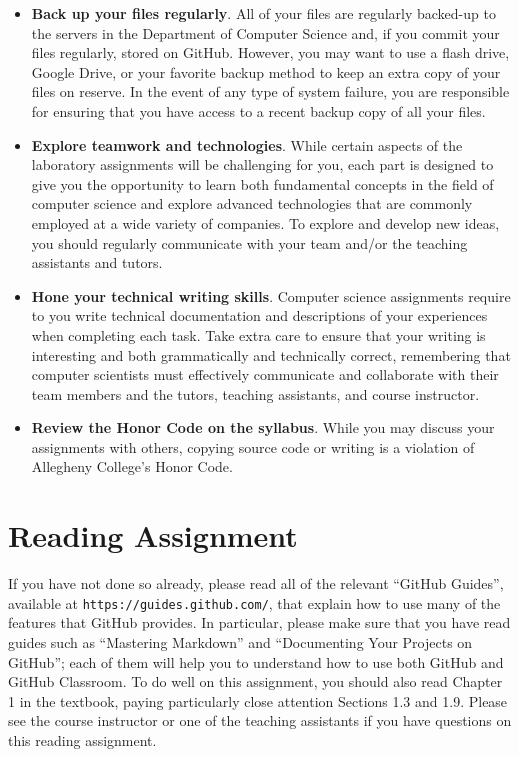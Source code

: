 \documentclass[11pt]{article}
\newcommand{\url}[1]{\lstinline{#1}}
\begin{document}
\begin{itemize}
\item {\bf Back up your files regularly}. All of your files are regularly
  backed-up to the servers in the Department of Computer Science and, if you
  commit your files regularly, stored on GitHub. However, you may want to use a
  flash drive, Google Drive, or your favorite backup method to keep an extra
  copy of your files on reserve. In the event of any type of system failure,
  you are responsible for ensuring that you have access to a recent backup copy
  of all your files.

\item {\bf Explore teamwork and technologies}. While certain aspects of the
  laboratory assignments will be challenging for you, each part is designed to
  give you the opportunity to learn both fundamental concepts in the field of
  computer science and explore advanced technologies that are commonly employed
  at a wide variety of companies. To explore and develop new ideas, you should
  regularly communicate with your team and/or the teaching assistants and
  tutors.

\item {\bf Hone your technical writing skills}. Computer science assignments
  require to you write technical documentation and descriptions of your
  experiences when completing each task. Take extra care to ensure that your
  writing is interesting and both grammatically and technically correct,
  remembering that computer scientists must effectively communicate and
  collaborate with their team members and the tutors, teaching assistants, and
  course instructor.

\item {\bf Review the Honor Code on the syllabus}. While you may discuss your
  assignments with others, copying source code or writing is a violation of
  Allegheny College's Honor Code.

\end{itemize}

\section*{Reading Assignment}

If you have not done so already, please read all of the relevant ``GitHub
Guides'', available at \url{https://guides.github.com/}, that explain how to use
many of the features that GitHub provides. In particular, please make sure that
you have read guides such as ``Mastering Markdown'' and ``Documenting Your
Projects on GitHub''; each of them will help you to understand how to use both
GitHub and GitHub Classroom. To do well on this assignment, you should also read
Chapter 1 in the textbook, paying particularly close attention Sections 1.3 and
1.9. Please see the course instructor or one of the teaching assistants if you
have questions on this reading assignment.
\end{document}
